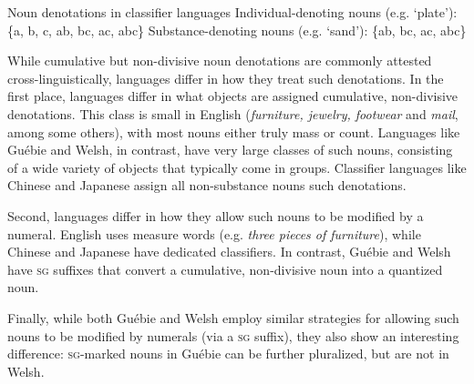 \documentclass[output=paper,colorlinks,citecolor=brown]{langscibook}
\begin{document}
\ea%
    \label{ex:sande:21}
    Noun denotations in classifier languages
    \ea%
    \label{ex:sande:21a}
    Individual-denoting nouns (e.g. `plate'): \{a, b, c, ab, bc, ac, abc\}
    \ex%
    \label{ex:sande:21b}
    Substance-denoting nouns (e.g. `sand'): \{ab, bc, ac, abc\}
    \z
\z

While cumulative but non-divisive noun denotations are commonly attested cross-linguistically, languages differ in how they treat such denotations.
In the first place, languages differ in what objects are assigned cumulative, non-divisive denotations. This class is small in English (\textit{furniture, jewelry, footwear} and \textit{mail}, among some others), with most nouns either truly mass or count. Languages like Guébie and Welsh, in contrast, have very large classes of such nouns, consisting of a wide variety of objects that typically come in groups. Classifier languages like Chinese and Japanese assign all non-substance nouns such denotations.

Second, languages differ in how they allow such nouns to be modified by a numeral. English uses measure words (e.g. \textit{three pieces of furniture}), while Chinese and Japanese have dedicated classifiers. In contrast, Guébie and Welsh have \textsc{sg} suffixes that convert a cumulative, non-divisive noun into a quantized noun.

Finally, while both Guébie and Welsh employ similar strategies for allowing such nouns to be modified by numerals (via a \textsc{sg} suffix), they also show an interesting difference: \textsc{sg}-marked nouns in Guébie can be further pluralized, but are not in Welsh.


\end{document}
